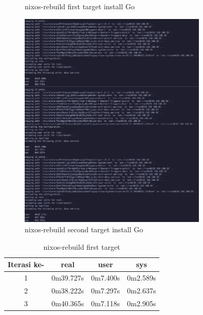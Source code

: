 \documentclass[10pt,twoside]{report}
\begin{document}
\begin{adjustwidth}{20pt}{}
\begin{figure}[H]
\begin{center}
		\end{center}
		\caption{nixos-rebuild first target install Go}
	\end{figure}
	\newpage
	\begin{figure}[H]
		\begin{center}
			\includegraphics[width=0.8\textwidth]{images/nix-target/nix-go-26-com.png}
		\end{center}
		\caption{nixos-rebuild second target install Go}
	\end{figure}
	\begin{table}[H]
		\caption{nixos-rebuild first target}
		\begin{center}
			\begin{tabular}[c]{|c|c|c|c|}
				\hline
				\multicolumn{1}{|c|}{\textbf{Iterasi ke-}} &
				\multicolumn{1}{c|}{\textbf{real}}         &
				\multicolumn{1}{c|}{\textbf{user}}         &
				\multicolumn{1}{c|}{\textbf{sys}}                                            \\
				\hline
				1                                          & 0m39.727s & 0m7.400s & 0m2.589s \\
				\hline
				2                                          & 0m38.222s & 0m7.297s & 0m2.637s \\
				\hline
				3                                          & 0m40.365s & 0m7.118s & 0m2.905s \\
				\hline
			\end{tabular}

\end{center}
\end{table}
\end{adjustwidth}
\end{document}
